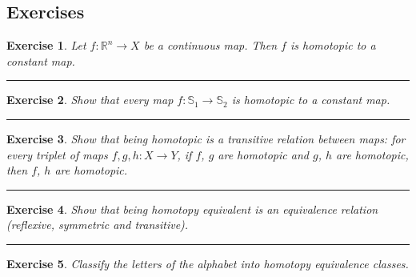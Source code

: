 \documentclass[a4paper,11pt]{article}
\newcommand{\linia}{\rule{\linewidth}{0.5pt}}
\theoremstyle{mytheor}
\theoremstyle{mytheor}
\newtheorem{exercise}{Exercise}
\theoremstyle{remark}
\newcommand{\R}{\mathbb{R}}
\begin{document}
\subsection{Exercises}

\begin{exercise}
    Let $f : \R^n \to X$ be a continuous map. Then $f$ is homotopic to a constant map.
\end{exercise}

\noindent\linia

\begin{exercise}
    Show that every map $f : \mathbb{S}_1 \to \mathbb{S}_2$ is homotopic to a constant map.
\end{exercise}

\noindent\linia

\begin{exercise}
    Show that being homotopic is a transitive relation between maps: for every
    triplet of maps $f, g, h: X \to Y$, if $f$, $g$ are homotopic and $g$, $h$
    are homotopic, then $f$, $h$ are homotopic.
\end{exercise}

\noindent\linia

\begin{exercise}
    Show that being homotopy equivalent is an equivalence relation (reflexive,
    symmetric and transitive).
\end{exercise}

\noindent\linia

\begin{exercise}
    Classify the letters of the alphabet into homotopy equivalence classes.
\end{exercise}
\end{document}
